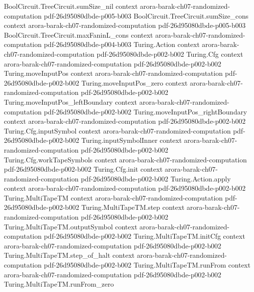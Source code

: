 \begin{theorem}
\proofstep
  {BoolCircuit.TreeCircuit.sumSize_nil}
  {context}
  {arora-barak-ch07-randomized-computation}
  {pdf-26d95080dbde-p005-b003}
\proofstep
  {BoolCircuit.TreeCircuit.sumSize_cons}
  {context}
  {arora-barak-ch07-randomized-computation}
  {pdf-26d95080dbde-p005-b003}
\proofstep
  {BoolCircuit.TreeCircuit.maxFaninL_cons}
  {context}
  {arora-barak-ch07-randomized-computation}
  {pdf-26d95080dbde-p004-b003}
\proofstep
  {Turing.Action}
  {context}
  {arora-barak-ch07-randomized-computation}
  {pdf-26d95080dbde-p002-b002}
\proofstep
  {Turing.Cfg}
  {context}
  {arora-barak-ch07-randomized-computation}
  {pdf-26d95080dbde-p002-b002}
\proofstep
  {Turing.moveInputPos}
  {context}
  {arora-barak-ch07-randomized-computation}
  {pdf-26d95080dbde-p002-b002}
\proofstep
  {Turing.moveInputPos_zero}
  {context}
  {arora-barak-ch07-randomized-computation}
  {pdf-26d95080dbde-p002-b002}
\proofstep
  {Turing.moveInputPos_leftBoundary}
  {context}
  {arora-barak-ch07-randomized-computation}
  {pdf-26d95080dbde-p002-b002}
\proofstep
  {Turing.moveInputPos_rightBoundary}
  {context}
  {arora-barak-ch07-randomized-computation}
  {pdf-26d95080dbde-p002-b002}
\proofstep
  {Turing.Cfg.inputSymbol}
  {context}
  {arora-barak-ch07-randomized-computation}
  {pdf-26d95080dbde-p002-b002}
\proofstep
  {Turing.inputSymbolInner}
  {context}
  {arora-barak-ch07-randomized-computation}
  {pdf-26d95080dbde-p002-b002}
\proofstep
  {Turing.Cfg.workTapeSymbols}
  {context}
  {arora-barak-ch07-randomized-computation}
  {pdf-26d95080dbde-p002-b002}
\proofstep
  {Turing.Cfg.init}
  {context}
  {arora-barak-ch07-randomized-computation}
  {pdf-26d95080dbde-p002-b002}
\proofstep
  {Turing.Action.apply}
  {context}
  {arora-barak-ch07-randomized-computation}
  {pdf-26d95080dbde-p002-b002}
\proofstep
  {Turing.MultiTapeTM}
  {context}
  {arora-barak-ch07-randomized-computation}
  {pdf-26d95080dbde-p002-b002}
\proofstep
  {Turing.MultiTapeTM.step}
  {context}
  {arora-barak-ch07-randomized-computation}
  {pdf-26d95080dbde-p002-b002}
\proofstep
  {Turing.MultiTapeTM.outputSymbol}
  {context}
  {arora-barak-ch07-randomized-computation}
  {pdf-26d95080dbde-p002-b002}
\proofstep
  {Turing.MultiTapeTM.initCfg}
  {context}
  {arora-barak-ch07-randomized-computation}
  {pdf-26d95080dbde-p002-b002}
\proofstep
  {Turing.MultiTapeTM.step_of_halt}
  {context}
  {arora-barak-ch07-randomized-computation}
  {pdf-26d95080dbde-p002-b002}
\proofstep
  {Turing.MultiTapeTM.runFrom}
  {context}
  {arora-barak-ch07-randomized-computation}
  {pdf-26d95080dbde-p002-b002}
\proofstep
  {Turing.MultiTapeTM.runFrom_zero}

\end{theorem}
